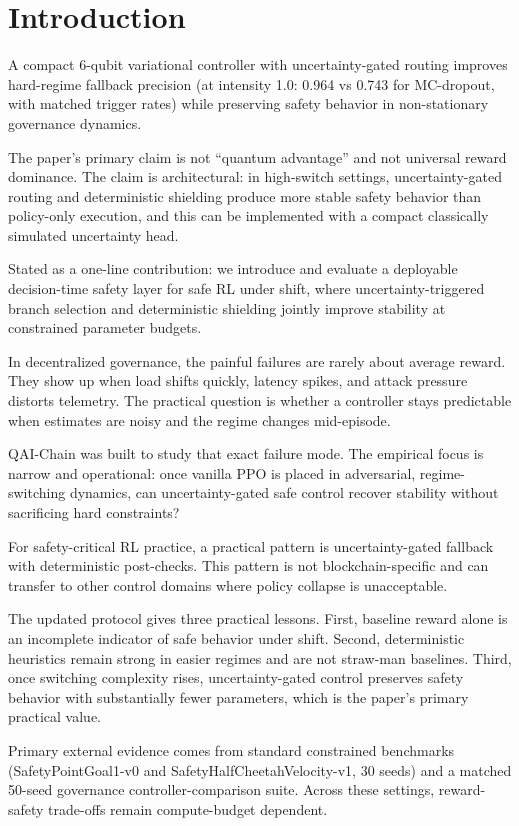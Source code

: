\section{Introduction}

A compact 6-qubit variational controller with uncertainty-gated routing improves hard-regime fallback precision (at intensity 1.0: 0.964 vs 0.743 for MC-dropout, with matched trigger rates) while preserving safety behavior in non-stationary governance dynamics.

The paper's primary claim is not ``quantum advantage'' and not universal reward dominance. The claim is architectural: in high-switch settings, uncertainty-gated routing and deterministic shielding produce more stable safety behavior than policy-only execution, and this can be implemented with a compact classically simulated uncertainty head.

Stated as a one-line contribution: we introduce and evaluate a deployable decision-time safety layer for safe RL under shift, where uncertainty-triggered branch selection and deterministic shielding jointly improve stability at constrained parameter budgets.

In decentralized governance, the painful failures are rarely about average reward. They show up when load shifts quickly, latency spikes, and attack pressure distorts telemetry. The practical question is whether a controller stays predictable when estimates are noisy and the regime changes mid-episode.

QAI-Chain was built to study that exact failure mode. The empirical focus is narrow and operational: once vanilla PPO is placed in adversarial, regime-switching dynamics, can uncertainty-gated safe control recover stability without sacrificing hard constraints?

For safety-critical RL practice, a practical pattern is uncertainty-gated fallback with deterministic post-checks. This pattern is not blockchain-specific and can transfer to other control domains where policy collapse is unacceptable.

The updated protocol gives three practical lessons. First, baseline reward alone is an incomplete indicator of safe behavior under shift. Second, deterministic heuristics remain strong in easier regimes and are not straw-man baselines. Third, once switching complexity rises, uncertainty-gated control preserves safety behavior with substantially fewer parameters, which is the paper's primary practical value.

Primary external evidence comes from standard constrained benchmarks (SafetyPointGoal1-v0 and SafetyHalfCheetahVelocity-v1, 30 seeds) and a matched 50-seed governance controller-comparison suite. Across these settings, reward-safety trade-offs remain compute-budget dependent.


